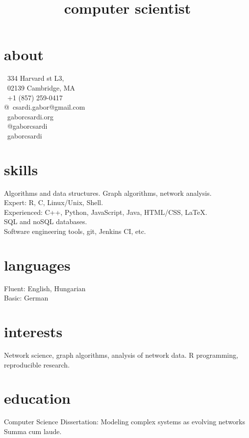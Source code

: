 \documentclass[11pt]{moderncv}
\title{computer scientist}
\begin{document}
\RaggedRight

\makecvtitle

\begin{aside}
\section{about}
\faEnvelope\ 334 Harvard st L3,\\
\textcolor{color4}{\faEnvelope}\ 02139 Cambridge, MA\\
\faPhone\ +1 (857) 259-0417\\
@\ \nolinebreak{}csardi.gabor@gmail.com\\
\faGlobe\ gaborcsardi.org\\
\faTwitter\ @gaborcsardi\\
\faGithub\ gaborcsardi
\section{skills}
Algorithms and data structures.
Graph algorithms, network analysis.\\[6pt]
Expert: R, C, Linux/Unix, Shell.\\
Experienced: C++, Python, JavaScript,
  Java, HTML/CSS, \LaTeX.\\[6pt]
SQL and noSQL databases.\\[6pt]
Software engineering tools,
git, Jenkins CI, etc.

\section{languages}
Fluent: English, Hungarian\\
Basic: German
\end{aside}

\section{interests}

Network science, graph algorithms, analysis of network data.
R programming, reproducible research.

\section{education}

%
{Computer Science}%
{Dissertation: Modeling complex systems as evolving networks\\
Summa cum laude.}
\end{document}
